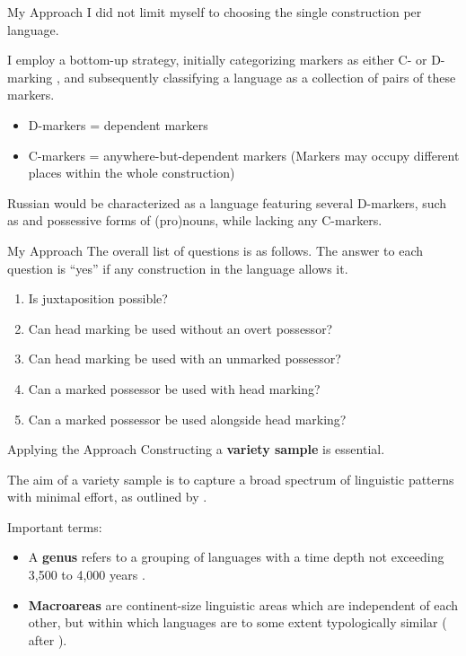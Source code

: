 \documentclass[12pt,aspectratio=169,t]{beamer}
\renewcommand{\'}{\textquotesingle}
\begin{document}
\begin{frame}{My Approach}
	I did not limit myself to choosing the single construction per language.
	
	I employ a bottom-up strategy, initially categorizing markers as either C- or D-marking \citep{lander2020head}, and subsequently classifying a language as a collection of pairs of these markers.
	
	\begin{itemize}
		\item D-markers = dependent markers
		\item C-markers = anywhere-but-dependent markers (Markers may occupy different places within the whole construction)
	\end{itemize}
	
	 Russian would be characterized as a language featuring several D-markers, such as \Gen{} and possessive forms of (pro)nouns, while lacking any C-markers.
	 
\end{frame}

\begin{frame}{My Approach}
	The overall list of questions is as follows. The answer to each question is ``yes'' if any construction in the language allows it.
	
	\begin{enumerate}
		\item Is juxtaposition possible?
		\item Can head marking be used without an overt possessor?
		\item Can head marking be used with an unmarked possessor?
		\item Can a marked possessor be used with head marking?
		\item Can a marked possessor be used alongside head marking?
	\end{enumerate}
\end{frame}

\begin{frame}{Applying the Approach}
	Constructing a \textbf{variety sample} is essential.
	
	\pause
	The aim of a variety sample is to capture a broad spectrum of linguistic patterns with minimal effort, as outlined by \cite{miestamo2016sampling}.
	
	\pause
	
	Important terms:
	
	\vspace{-0.7em}
	\begin{itemize}
		\item A \textbf{genus} refers to a grouping of languages with a time depth not exceeding 3,500 to 4,000 years \citep{dryer1989large}.
		\item \textbf{Macroareas} are continent-size linguistic areas
		which are independent of each other, but within which languages are to some
		extent typologically similar (\citealt{miestamo2016sampling} after \citealt{dryer1989large}).
	\end{itemize}
\end{frame}
\end{document}
